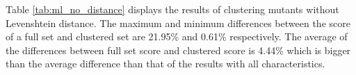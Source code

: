 \documentclass[../../main]{subfiles}
\begin{document}
\FloatBarrier
Table \ref{tab:ml_no_distance} displays the results of clustering mutants without Levenshtein distance.
The maximum and minimum differences between the score of a full set and clustered set are 21.95\% and 0.61\% respectively.
The average of the differences between full set score and clustered score is 4.44\% which is bigger than the average difference than that of the results with all characteristics.
\end{document}
